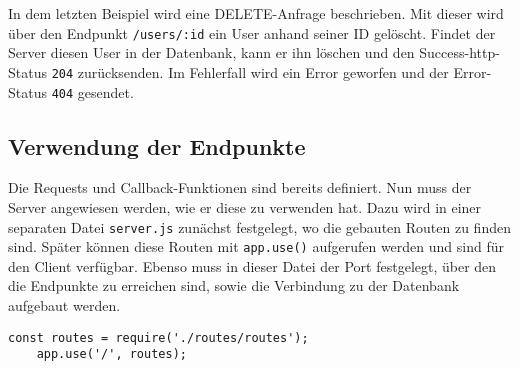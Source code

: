 In dem letzten Beispiel wird eine DELETE-Anfrage beschrieben. Mit dieser wird über den Endpunkt \texttt{/users/:id} ein User anhand seiner ID gelöscht. Findet der Server diesen User in der Datenbank, kann er ihn löschen und den Success-http-Status \texttt{204} zurücksenden. Im Fehlerfall wird ein Error geworfen und der Error-Status \texttt{404} gesendet.

\subsection{Verwendung der Endpunkte}
Die Requests und Callback-Funktionen sind bereits definiert. Nun muss der Server angewiesen werden, wie er diese zu verwenden hat. Dazu wird in einer separaten Datei \texttt{server.js} zunächst festgelegt, wo die gebauten Routen zu finden sind. Später können diese Routen mit \texttt{app.use()} aufgerufen werden und sind für den Client verfügbar. Ebenso muss in dieser Datei der Port festgelegt, über den die Endpunkte zu erreichen sind, sowie die Verbindung zu der Datenbank aufgebaut werden.

\begin{lstlisting}[caption=Verwendung der API-Routen, label=lst:apiroutenverwendung,float=!htb] 
    const routes = require('./routes/routes');
    app.use('/', routes);
\end{lstlisting}
